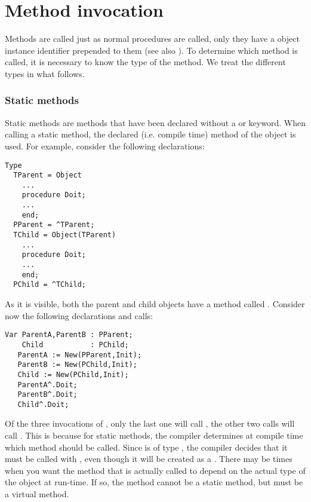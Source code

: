 \documentclass{report}
\begin{document}
\section{Method invocation}
Methods are called just as normal procedures are called, only they have a
object instance identifier prepended to them (see also ).
To determine which method is called, it is necessary to know the type of
the method. We treat the different types in what follows.
\subsubsection{Static methods}
Static methods are methods that have been declared without a 
or  keyword. When calling a static method, the declared (i.e.
compile time) method of the object is used.
For example, consider the following declarations:
\begin{verbatim}
Type
  TParent = Object
    ...
    procedure Doit;
    ...
    end;
  PParent = ^TParent;
  TChild = Object(TParent)
    ...
    procedure Doit;
    ...
    end;
  PChild = ^TChild;
\end{verbatim}
As it is visible, both the parent and child objects have a method called
. Consider now the following declarations and calls:
\begin{verbatim}
Var ParentA,ParentB : PParent;
    Child           : PChild;
   ParentA := New(PParent,Init);
   ParentB := New(PChild,Init);
   Child := New(PChild,Init);
   ParentA^.Doit;
   ParentB^.Doit;
   Child^.Doit;
\end{verbatim}
Of the three invocations of , only the last one will call
, the other two calls will call .
This is because for static methods, the compiler determines at compile
time which method should be called. Since  is of type
, the compiler decides that it must be called with
, even though it will be created as a .
There may be times when you want the method that is actually called to
depend on the actual type of the object at run-time. If so, the method
cannot be a static method, but must be a virtual method.
\end{document}
